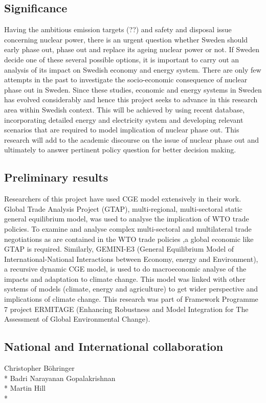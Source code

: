 \documentclass[10pt,a4paper]{article}
\begin{document}
\subsection{Significance}
Having the ambitious emission targets (??) and safety and disposal issue concerning nuclear power, there is an urgent question whether Sweden should early phase out, phase out and replace its ageing nuclear power or not. If Sweden decide one of these several possible options, it is important to carry out an analysis of its impact on Swedish economy and energy system. There are only few attempts in the past to investigate the socio-economic consequence of nuclear phase out in Sweden. Since these studies, economic and energy systems in Sweden has evolved considerably and hence this project seeks to advance in this research area within Swedish context. This will be achieved by using recent database, incorporating detailed energy and electricity system and developing relevant scenarios that are required to model implication of nuclear phase out. This research will add to the academic discourse on the issue of nuclear phase out and ultimately to answer pertinent policy question for better decision making.

\subsection{Preliminary results}
Researchers of this project have used CGE model extensively in their work. Global Trade Analysis Project (GTAP), multi-regional, multi-sectoral static general equilibrium model, was used to analyse the implication of WTO trade policies. To examine and analyse complex multi-sectoral and multilateral trade negotiations as are contained in the WTO trade policies ,a global economic like GTAP is required. Similarly, GEMINI-E3 (General Equilibrium Model of International-National Interactions between Economy, energy and Environment), a recursive dynamic CGE model, is used to do macroeconomic analyse of the impacts and adaptation to climate change. This model was linked with other systems of models (climate, energy and agriculture) to get wider perspective and implications of climate change. This research was part of Framework Programme 7 project ERMITAGE (Enhancing Robustness and Model Integration for The Assessment of Global Environmental Change).

\subsection{National and International collaboration}
Christopher Böhringer\\*
Badri Narayanan Gopalakrishnan\\*
Martin Hill\\*
\end{document}
